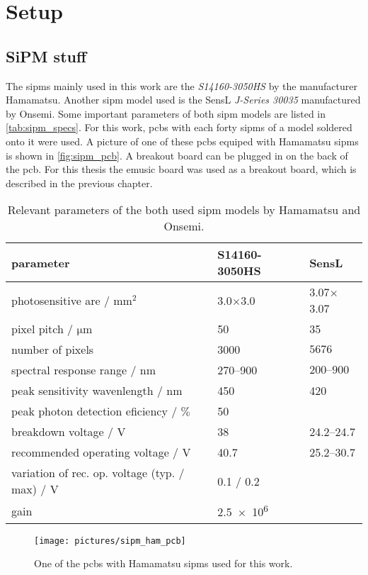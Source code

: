 \chapter{Setup}

\section{SiPM stuff}
The \acp{sipm} mainly used in this work are the \textit{S14160-3050HS} by the manufacturer Hamamatsu.
Another \ac{sipm} model used is the SensL \textit{J-Series 30035} manufactured by Onsemi.
Some important parameters of both \ac{sipm} models are listed in \autoref{tab:sipm_specs}.
For this work, \acp{pcb} with each forty \acp{sipm} of a model soldered onto it were used.
A picture of one of these \acp{pcb} equiped with Hamamatsu \acp{sipm} is shown in \autoref{fig:sipm_pcb}.
A breakout board can be plugged in on the back of the \ac{pcb}.
For this thesis the \ac{emusic} board was used as a breakout board, which is described in the previous chapter.
\begin{table}
	\centering
	\caption[SiPM parameters]{Relevant parameters of the both used \ac{sipm} models by Hamamatsu and Onsemi. \cite{}}
	\label{tab:sipm_specs}
	\renewcommand{\arraystretch}{1.3}
	\begin{tabularx}{\textwidth}{Xp{}p{}}
	    \toprule
	    parameter								& S14160-3050HS		& SensL			\\\midrule
	    photosensitive are / $\si{\milli\meter\squared}$			& 3.0$\times$3.0	& 3.07$\times$3.07	\\
	    pixel pitch / $\si{\micro\meter}$					& 50			& 35			\\
	    number of pixels							& 3000			& $\num{5676}$		\\
	    spectral response range / $\si{\nano\meter}$			& \numrange{270}{900}	& $\numrange{200}{900}$	\\
	    peak sensitivity wavenlength / $\si{\nano\meter}$			& 450			& 420			\\
	    peak photon detection eficiency / $\si{\percent}$			& 50			& 			\\
	    breakdown voltage / $\si{\volt}$					& 38			& \numrange{24.2}{24.7}	\\
	    recommended operating voltage / $\si{\volt}$			& 40.7			& \numrange{25.2}{30.7}	\\
	    variation of rec. op. voltage (typ. / max) / $\si{\volt}$		& 0.1 / 0.2		&			\\
	    gain								& \num{2.5e6}		&			\\
	    \bottomrule
	\end{tabularx}
	\renewcommand{\arraystretch}{1}
\end{table} 
\begin{figure}
	\centering
	\texttt{[image: pictures/sipm\_ham\_pcb]}
	\caption[\ac{pcb} with Hamamatsu \acp{sipm}]{One of the \acp{pcb} with Hamamatsu \acp{sipm} used for this work.}
	\label{fig:sipm_pcb}
\end{figure}

